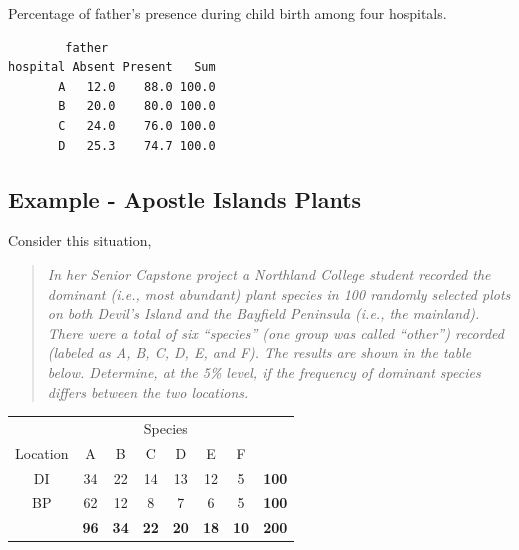 \documentclass[10pt,openany]{book}\usepackage[]{graphicx}\usepackage[]{color}
\makeatletter
\newenvironment{kframe}{%
 \def\at@end@of@kframe{}%
 \ifinner\ifhmode%
  \def\at@end@of@kframe{\end{minipage}}%
  \begin{minipage}{\columnwidth}%
 \fi\fi%
 \def\FrameCommand##1{\hskip\@totalleftmargin \hskip-\fboxsep
 \colorbox{shadecolor}{##1}\hskip-\fboxsep
     \hskip-\linewidth \hskip-\@totalleftmargin \hskip\columnwidth}%
 \MakeFramed {\advance\hsize-\width
   \@totalleftmargin\z@ \linewidth\hsize
   \@setminipage}}%
 {\par\unskip\endMakeFramed%
 \at@end@of@kframe}
\newenvironment{knitrout}{}{} %
\makeatother
\begin{document}
\begin{table}[h]
  \caption{Percentage of father's presence during child birth among four hospitals.}
  \label{tab:ChiFProw}
  \vspace{-12pt}
\begin{knitrout}
\color{fgcolor}\begin{kframe}
\begin{verbatim}
        father
hospital Absent Present   Sum
       A   12.0    88.0 100.0
       B   20.0    80.0 100.0
       C   24.0    76.0 100.0
       D   25.3    74.7 100.0
\end{verbatim}
\end{kframe}
\end{knitrout}
\end{table}





\subsection{Example - Apostle Islands Plants}
Consider this situation,
\begin{quote}
\textsl{In her Senior Capstone project a Northland College student recorded the dominant (i.e., most abundant) plant species in 100 randomly selected plots on both Devil's Island and the Bayfield Peninsula (i.e., the mainland).  There were a total of six ``species'' (one group was called ``other'') recorded (labeled as A, B, C, D, E, and F).  The results are shown in the table below.  Determine, at the 5\% level, if the frequency of dominant species differs between the two locations.}
\end{quote}

\begin{center}
  \begin{tabular}{c|c|c|c|c|c|c|c|}
    \multicolumn{1}{c}{} & \multicolumn{6}{c}{Species} & \multicolumn{1}{c}{} \\
    \cline{2-7}
    Location & A & B & C & D & E & F & \multicolumn{1}{c}{} \\
    \hline
    \multicolumn{1}{|c|}{DI} & 34 & 22 & 14 & 13 & 12 & 5 & \textbf{100} \\
    \hline
    \multicolumn{1}{|c|}{BP} & 62 & 12 & 8 & 7 & 6 & 5 & \textbf{100} \\
    \hline
    & \textbf{96} & \textbf{34} & \textbf{22} & \textbf{20} & \textbf{18} & \textbf{10} & \textbf{200} \\
    \cline{2-8}
  \end{tabular}
\end{center}
\end{document}
